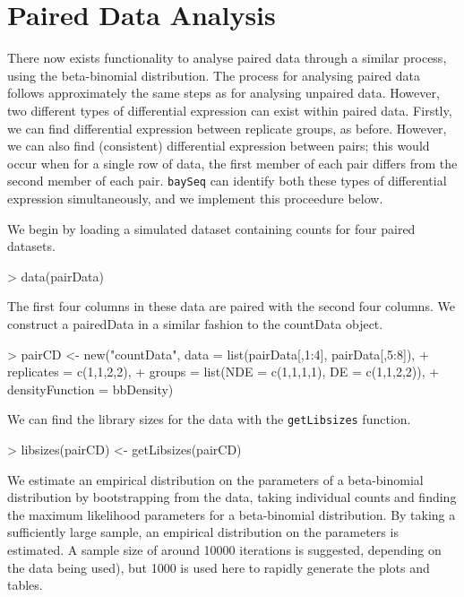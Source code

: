 \documentclass[a4paper]{article}
\begin{document}
\clearpage

\section{Paired Data Analysis}

There now exists functionality to analyse paired data through a similar process, using the beta-binomial distribution. The process for analysing paired data follows approximately the same steps as for analysing unpaired data. However, two different types of differential expression can exist within paired data. Firstly, we can find differential expression between replicate groups, as before. However, we can also find (consistent) differential expression between pairs; this would occur when for a single row of data, the first member of each pair differs from the second member of each pair. \verb'baySeq' can identify both these types of differential expression simultaneously, and we implement this proceedure below.

We begin by loading a simulated dataset containing counts for four paired datasets.
\begin{Schunk}
\begin{Sinput}
>   data(pairData)  
\end{Sinput}
\end{Schunk}

The first four columns in these data are paired with the second four columns. We construct a pairedData in a similar fashion to the countData object.
\begin{Schunk}
\begin{Sinput}
> pairCD <- new("countData", data = list(pairData[,1:4], pairData[,5:8]),
+                  replicates = c(1,1,2,2),
+                  groups = list(NDE = c(1,1,1,1), DE = c(1,1,2,2)),
+               densityFunction = bbDensity)
\end{Sinput}
\end{Schunk}

We can find the library sizes for the data with the \verb'getLibsizes' function.
\begin{Schunk}
\begin{Sinput}
> libsizes(pairCD) <- getLibsizes(pairCD)
\end{Sinput}
\end{Schunk}

We estimate an empirical distribution on the parameters of a beta-binomial distribution by bootstrapping from the data, taking individual counts and finding the maximum likelihood parameters for a beta-binomial distribution. By taking a sufficiently large sample, an empirical distribution on the parameters is estimated. A sample size of around 10000 iterations is suggested, depending on the data being used), but 1000 is used here to rapidly generate the plots and tables.
\end{document}

